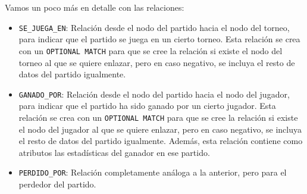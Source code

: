 \noindent Vamos un poco más en detalle con las relaciones:
\begin{itemize}
\item \texttt{SE\_JUEGA\_EN}: Relación desde el nodo del partido hacia el nodo del torneo, para indicar que el partido se juega en un cierto torneo. Esta relación se crea con un \texttt{OPTIONAL MATCH} para que se cree la relación si existe el nodo del torneo al que se quiere enlazar, pero en caso negativo, se incluya el resto de datos del partido igualmente.
\item \texttt{GANADO\_POR}: Relación desde el nodo del partido hacia el nodo del jugador, para indicar que el partido ha sido ganado por un cierto jugador. Esta relación se crea con un \texttt{OPTIONAL MATCH} para que se cree la relación si existe el nodo del jugador al que se quiere enlazar, pero en caso negativo, se incluya el resto de datos del partido igualmente. Además, esta relación contiene como atributos las estadísticas del ganador en ese partido. 
\item \texttt{PERDIDO\_POR}: Relación completamente análoga a la anterior, pero para el perdedor del partido.
\end{itemize}

